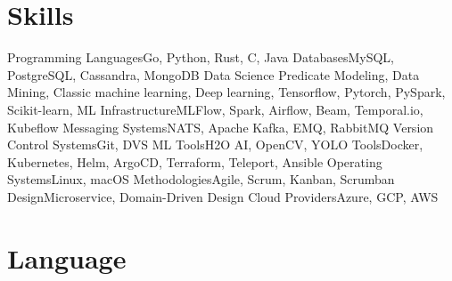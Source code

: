 \section{Skills}

\cvline%
{Programming Languages}{Go, Python, Rust, C, Java}
\cvline%
{Databases}{MySQL, PostgreSQL, Cassandra, MongoDB}
\cvline%
{Data Science}{
  Predicate Modeling, Data Mining,
  Classic machine learning,
  Deep learning, Tensorflow, Pytorch, PySpark, Scikit-learn,
}
\cvline%
{ML Infrastructure}{MLFlow, Spark, Airflow, Beam, Temporal.io, Kubeflow}
\cvline%
{Messaging Systems}{NATS, Apache Kafka, EMQ, RabbitMQ}
\cvline%
{Version Control Systems}{Git, DVS}
\cvline%
{ML Tools}{H2O AI, OpenCV, YOLO}
\cvline%
{Tools}{Docker, Kubernetes, Helm, ArgoCD, Terraform, Teleport, Ansible}
\cvline%
{Operating Systems}{Linux, macOS}
\cvline%
{Methodologies}{Agile, Scrum, Kanban, Scrumban}
\cvline%
{Design}{Microservice, Domain-Driven Design}
\cvline%
{Cloud Providers}{Azure, GCP, AWS}

\section{Language}


\emptysection{}\closesection{}
